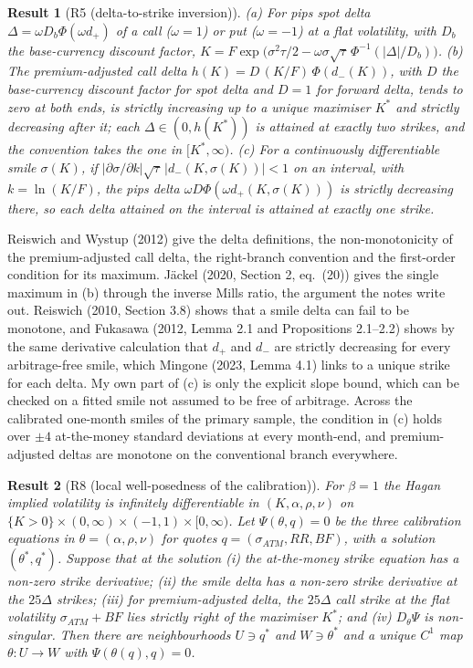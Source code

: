 \documentclass[11pt]{article}
\theoremstyle{result}
\newtheorem*{result}{Result}
\newcommand{\D}{\Delta}
\begin{document}
\begin{result}[R5 (delta-to-strike inversion)]
(a) For pips spot delta $\D=\omega D_b\Phi(\omega d_+)$ of a call ($\omega=1$) or put ($\omega=-1$) at a flat volatility, with $D_b$ the base-currency discount factor, $K=F\exp\bigl(\sigma^2\tau/2-\omega\sigma\sqrt\tau\,\Phi^{-1}(|\D|/D_b)\bigr)$. (b) The premium-adjusted call delta $h(K)=D\,(K/F)\,\Phi(d_-(K))$, with $D$ the base-currency discount factor for spot delta and $D=1$ for forward delta, tends to zero at both ends, is strictly increasing up to a unique maximiser $K^*$ and strictly decreasing after it; each $\D\in(0,h(K^*))$ is attained at exactly two strikes, and the convention takes the one in $[K^*,\infty)$. (c) For a continuously differentiable smile $\sigma(K)$, if $|\partial\sigma/\partial k|\sqrt\tau\,|d_-(K,\sigma(K))|<1$ on an interval, with $k=\ln(K/F)$, the pips delta $\omega D\Phi(\omega d_+(K,\sigma(K)))$ is strictly decreasing there, so each delta attained on the interval is attained at exactly one strike.
\end{result}

Reiswich and Wystup (2012) give the delta definitions, the non-monotonicity of the premium-adjusted call delta, the right-branch convention and the first-order condition for its maximum. J\"ackel (2020, Section 2, eq.~(20)) gives the single maximum in (b) through the inverse Mills ratio, the argument the notes write out. Reiswich (2010, Section 3.8) shows that a smile delta can fail to be monotone, and Fukasawa (2012, Lemma 2.1 and Propositions 2.1--2.2) shows by the same derivative calculation that $d_+$ and $d_-$ are strictly decreasing for every arbitrage-free smile, which Mingone (2023, Lemma 4.1) links to a unique strike for each delta. My own part of (c) is only the explicit slope bound, which can be checked on a fitted smile not assumed to be free of arbitrage. Across the calibrated one-month smiles of the primary sample, the condition in (c) holds over $\pm4$ at-the-money standard deviations at every month-end, and premium-adjusted deltas are monotone on the conventional branch everywhere.

\begin{result}[R8 (local well-posedness of the calibration)]
For $\beta=1$ the Hagan implied volatility is infinitely differentiable in $(K,\alpha,\rho,\nu)$ on $\{K>0\}\times(0,\infty)\times(-1,1)\times[0,\infty)$. Let $\Psi(\theta,q)=0$ be the three calibration equations in $\theta=(\alpha,\rho,\nu)$ for quotes $q=(\sigma_{ATM},RR,BF)$, with a solution $(\theta^*,q^*)$. Suppose that at the solution (i) the at-the-money strike equation has a non-zero strike derivative; (ii) the smile delta has a non-zero strike derivative at the $25\D$ strikes; (iii) for premium-adjusted delta, the $25\D$ call strike at the flat volatility $\sigma_{ATM}+BF$ lies strictly right of the maximiser $K^*$; and (iv) $D_\theta\Psi$ is non-singular. Then there are neighbourhoods $U\ni q^*$ and $W\ni\theta^*$ and a unique $C^1$ map $\theta:U\to W$ with $\Psi(\theta(q),q)=0$.
\end{result}
\end{document}
